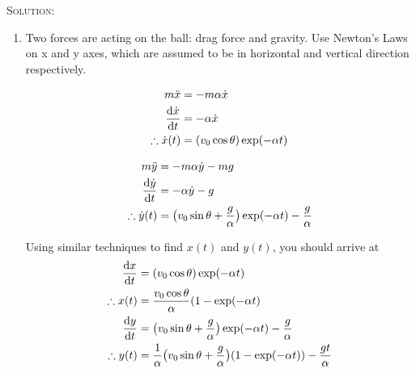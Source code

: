 \begin{enumerate}
\textsc{Solution:}
\begin{enumerate}
\item Two forces are acting on the ball: drag force and gravity. Use Newton's Laws on x and y axes, which are assumed to be in horizontal and vertical direction respectively.

\begin{minipage}{0.35\textwidth}
    \begin{align*}
        m\ddot{x} &= -m\alpha\dot{x}\\
        \frac{\mathop{}\!\mathrm{d} \dot{x}}{\mathop{}\!\mathrm{d} t} &= -\alpha \dot{x}\\
        \therefore \dot{x}(t) &= (v_0 \cos \theta)\exp({-\alpha t})
    \end{align*}
\end{minipage}
\begin{minipage}{0.6\textwidth}
    \begin{align*}
        m\ddot{y} &= -m\alpha \dot{y} - mg\\
        \frac{\mathop{}\!\mathrm{d} \dot{y}}{\mathop{}\!\mathrm{d} t} &= -\alpha \dot{y} - g\\
        \therefore \dot{y}(t) &= \big(v_0\sin \theta + \frac{g}{\alpha}\big)\exp({-\alpha t}) - \frac{g}{\alpha}
    \end{align*}
\end{minipage}
Using similar techniques to find $x(t)$ and $y(t)$, you should arrive at
\begin{align*}
    \frac{\mathop{}\!\mathrm{d} x}{\mathop{}\!\mathrm{d} t} &= (v_0\cos\theta)\exp(-\alpha t)\\
    \therefore x(t) &= \frac{v_0\cos\theta}{\alpha}(1 - \exp(-\alpha t)\\
    \frac{\mathop{}\!\mathrm{d} y}{\mathop{}\!\mathrm{d} t} &= \big(v_0\sin\theta + \frac{g}{\alpha}\big)\exp(-\alpha t) - \frac{g}{\alpha} \\
    \therefore y(t) &= \frac{1}{\alpha} \big(v_0\sin\theta + \frac{g}{\alpha} \big) (1 - \exp(-\alpha t)) - \frac{gt}{\alpha}
\end{align*}


\end{enumerate}
\end{enumerate}
